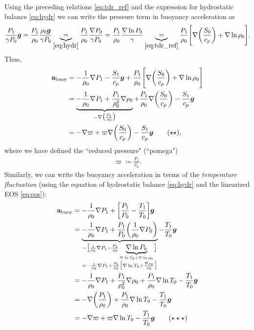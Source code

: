 \documentclass[12pt]{article} %
\newcommand{\pomega}{\varpi}
\begin{document}
	Using the preceding relations \eqref{eq:tdr_ref} and the expression for hydrostatic balance \eqref{eq:hydr} we can write the pressure term in buoyancy acceleration as
	\begin{align}
	\frac{P_1}{\gamma P_0}\bm{g} = \frac{P_1}{\rho_0}\frac{\rho_0\bm{g}}{\gamma P_0} \underbrace{=}_{\eqref{eq:hydr}} \frac{P_1}{\rho_0}\frac{\nabla P_0}{\gamma P_0} = \frac{P_1}{\rho_0} \frac{\nabla\ln P_0}{\gamma} \underbrace{=}_{\eqref{eq:tdr_ref}} \frac{P_1}{\rho_0}\Bigg{[}\nabla\bigg{(}\frac{S_0}{c_p}\bigg{)} + \nabla\ln\rho_0\Bigg{]}.
	\end{align}
	Thus, 
	\begin{align*}
	\mathbf{a}_{\rm{buoy}} &= -\frac{1}{\rho_0}\nabla P_1 - \frac{S_1}{c_p}\bm{g} + \frac{P_1}{\rho_0} \Bigg{[}\nabla\bigg{(}\frac{S_0}{c_p}\bigg{)} + \nabla\ln\rho_0\Bigg{]} \\
	&= \underbrace{-\frac{1}{\rho_0}\nabla P_1 + \frac{P_1}{\rho_0^2}\nabla\rho_0}_{-\nabla\big{(}\frac{P_1}{\rho_0}\big{)}} + \frac{P_1}{\rho_0}\nabla\bigg{(}\frac{S_0}{c_p}\bigg{)}-\frac{S_1}{c_p}\bm{g}\\
	&= -\nabla\pomega+\pomega\nabla\bigg{(}\frac{S_0}{c_p}\bigg{)} - \frac{S_1}{c_p}\bm{g}\tag{$\star\star$},
	\label{eq:abuoy1}
	\end{align*}
	where we have defined the ``reduced pressure" (``pomega")
	\begin{align}
	\pomega\coloneqq\frac{P_1}{\rho_0}.
	\end{align}
	Similarly, we can write the buoyancy acceleration in terms of the \textit{temperature fluctuation} (using the equation of hydrostatic balance \eqref{eq:hydr} and the linearized EOS \eqref{eq:eos}):
	\begin{align*}
	\mathbf{a}_{\rm{buoy}} &= -\frac{1}{\rho_0}\nabla P_1 +\bigg{[}\frac{P_1}{P_0}-\frac{T_1}{T_0}\bigg{]}\bm{g}\\
	&= \underbrace{-\frac{1}{\rho_0}\nabla P_1 + \frac{P_1}{P_0}\bigg{(}\frac{1}{\rho_0}\nabla P_0\bigg{)}}_{\substack{
		-\big{[}\frac{1}{\rho_0}\nabla P_1 - \frac{P_1}{\rho_0}\underbrace{\nabla\ln P_0}_{\nabla\ln T_0 + \nabla\ln\rho_0}\big{]} \\
		= -\frac{1}{\rho_0}\nabla P_1+ \frac{P_1}{\rho_0}\big{[}\nabla\ln T_0 + \frac{\nabla \rho_0}{\rho_0} \big{]}} } - \frac{T_1}{T_0}\bm{g}\\
	&= -\frac{1}{\rho_0}\nabla P_1 + \frac{P_1}{\rho_0^2}\nabla\rho_0 + \frac{P_1}{\rho_0}\nabla \ln T_0- \frac{T_1}{T_0}\bm{g}\\
	&= -\nabla\bigg{(}\frac{P_1}{\rho_0}\bigg{)}+\frac{P_1}{\rho_0}\nabla\ln T_0 - \frac{T_1}{T_0}\bm{g}\\
	& = -\nabla\pomega +\pomega\nabla\ln T_0 - \frac{T_1}{T_0}\bm{g}\tag{$\star\star\star$}
	\label{eq:abuoy2}
	\end{align*}
	
\end{document}
